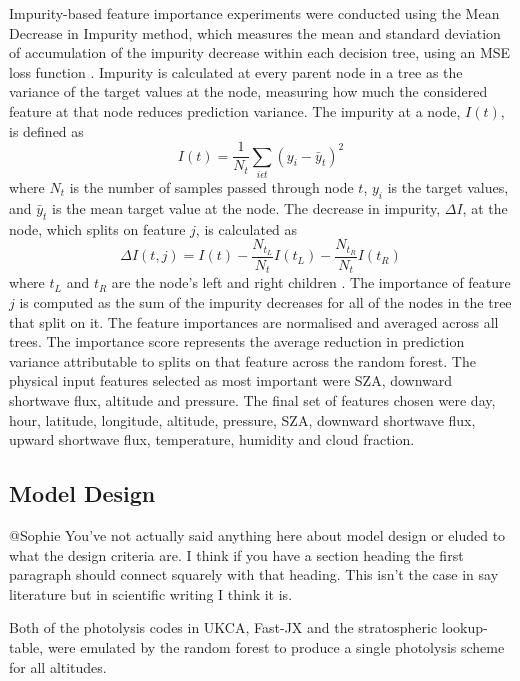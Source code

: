 \documentclass[journal abbreviation, manuscript]{copernicus}
\begin{document}
Impurity-based feature importance experiments were conducted using the Mean Decrease in Impurity method, which measures the mean and standard deviation of accumulation of the impurity decrease within each decision tree, using an MSE loss function \citep{tibshirani_elements_2001}.
Impurity is calculated at every parent node in a tree as the variance of the target values at the node, measuring how much the considered feature at that node reduces prediction variance. 
The impurity at a node, $I(t)$, is defined as
\begin{equation}
 I(t) = \frac{1}{N_t} \sum_{i\epsilon t} (y_i - \bar{y}_t)^2 
\end{equation}
where $N_t$ is the number of samples passed through node $t$, $y_i$ is the target values, and $\bar{y}_t$ is the mean target value at the node.
The decrease in impurity, $\Delta I$, at the node, which splits on feature $j$, is calculated as
\begin{equation}
\Delta I(t,j) = I(t) - \frac{N_{t_L}}{N_t}I(t_L) - \frac{N_{t_R}}{N_t}I(t_R)
\end{equation}
where $t_L$ and $t_R$ are the node's left and right children \citep{breiman_random_2001}.
The importance of feature $j$ is computed as the sum of the impurity decreases for all of the nodes in the tree that split on it. The feature importances are normalised and averaged across all trees. The importance score represents the average reduction in prediction variance attributable to splits on that feature across the random forest.
The physical input features selected as most important were SZA, downward shortwave flux, altitude and pressure.
The final set of features chosen were day, hour, latitude, longitude, altitude, pressure, SZA, downward shortwave flux, upward shortwave flux, temperature, humidity and cloud fraction. 


\subsection{Model Design}
@Sophie You've not actually said anything here about model design or eluded to what the design criteria are. I think if you have a section heading the first paragraph should connect squarely with that heading. This isn't the case in say literature but in scientific writing I think it is. 

Both of the photolysis codes in UKCA, Fast-JX and the stratospheric lookup-table, were emulated by the random forest to produce a single photolysis scheme for all altitudes.
\end{document}
